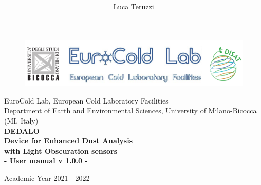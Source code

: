 \documentclass[a4paper, 11pt]{report}
\title{ }
\author{Luca Teruzzi}
\date{ }
\newcommand\blankpage{%
    \null
    \thispagestyle{empty}%
    \addtocounter{page}{-1}%
    \newpage}
\begin{document}
\begin{figure}[!htb]
\centering
\includegraphics[scale=0.47]{logo.png}
\end{figure}
\begin{center}
\vspace*{1 cm}
\Large EuroCold Lab, European Cold Laboratory Facilities \\
\Large Department of Earth and Environmental Sciences, University of Milano-Bicocca (MI, Italy) \\
\vspace*{3.5 cm}
\textbf{\huge \textbf{DEDALO} \\ Device for Enhanced Dust Analysis \\ with Light Obscuration sensors \\ \vspace*{1 cm} - User manual v 1.0.0 -}
\end{center}

\vspace*{7 cm}
\begin{center}
Academic Year  2021 - 2022
\end{center}

\newcommand{\abs}[1]{\left\lvert#1\right\rvert}
\newcommand{\angs}{\ensuremath{\smash{\mathrm{\ring A}}}}
\thispagestyle{empty}

\afterpage{\blankpage}

\end{document}

